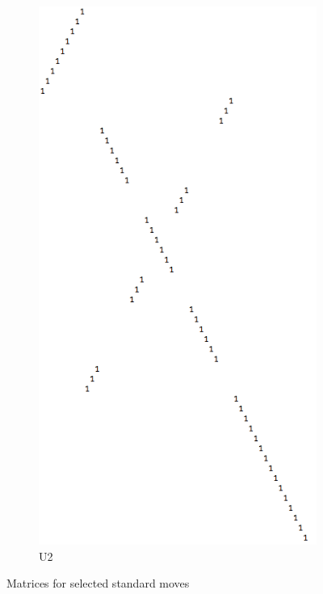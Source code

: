 \documentclass[11pt, oneside]{article}
\theoremstyle{plain}
\begin{document}
\begin{figure}[h!]
\begin{subfigure}[h]{0.4 \textwidth}
        \includegraphics[scale=0.30]{U2}
        \caption{U2}
    \end{subfigure}
    \caption{Matrices for selected standard moves}
\end{figure}

\newpage
\end{document}
